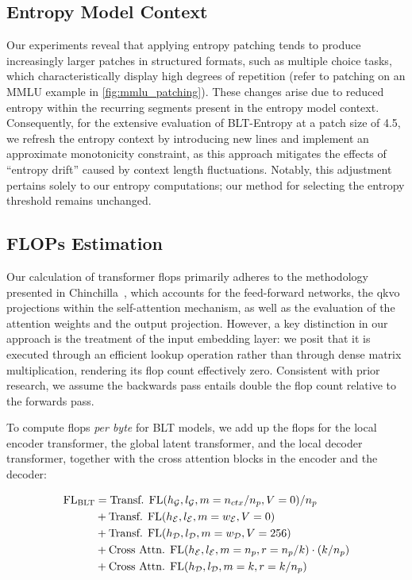 \subsection{Entropy Model Context}
\label{section:entropy-context}
Our experiments reveal that applying entropy patching tends to produce increasingly larger patches in structured formats, such as multiple choice tasks, which characteristically display high degrees of repetition (refer to patching on an MMLU example in \autoref{fig:mmlu_patching}). These changes arise due to reduced entropy within the recurring segments present in the entropy model context. Consequently, for the extensive evaluation of {\textsc BLT}-Entropy at a patch size of 4.5, we refresh the entropy context by introducing new lines and implement an approximate monotonicity constraint, as this approach mitigates the effects of “entropy drift” caused by context length fluctuations. Notably, this adjustment pertains solely to our entropy computations; our method for selecting the entropy threshold remains unchanged.

\subsection{FLOPs Estimation} 
\label{section:flops}

Our calculation of transformer flops primarily adheres to the methodology presented in Chinchilla~\citep{hoffmann2022training}, which accounts for the feed-forward networks, the qkvo projections within the self-attention mechanism, as well as the evaluation of the attention weights and the output projection. However, a key distinction in our approach is the treatment of the input embedding layer: we posit that it is executed through an efficient lookup operation rather than through dense matrix multiplication, rendering its flop count effectively zero. Consistent with prior research, we assume the backwards pass entails double the flop count relative to the forwards pass.

To compute flops \textit{per byte} for {\textsc BLT} models, we add up the flops for the local encoder transformer, the global latent transformer, and the local decoder transformer, together with the cross attention blocks in the encoder and the decoder:

\begin{align}
    \text{FL}_{\text{{\textsc BLT}}} &= \text{Transf. FL}(h_{\mathcal{G}}, l_{\mathcal{G}}, m=n_{ctx}/n_p,V=0) / n_p\\
   &+\text{Transf. FL}(h_{\mathcal{E}}, l_{\mathcal{E}}, m=w_{\mathcal{E}}, V=0) \\
   &+ \text{Transf. FL}(h_{\mathcal{D}}, l_{\mathcal{D}}, m=w_{\mathcal{D}}, V=256) \\ 
    &+ \text{Cross Attn. FL}(h_{\mathcal{E}}, l_{\mathcal{E}}, m=n_p, r=n_p/k) \cdot (k/n_p) \\ 
   &+ \text{Cross Attn. FL}(h_{\mathcal{D}}, l_{\mathcal{D}}, m=k, r=k/n_p)
\end{align}

